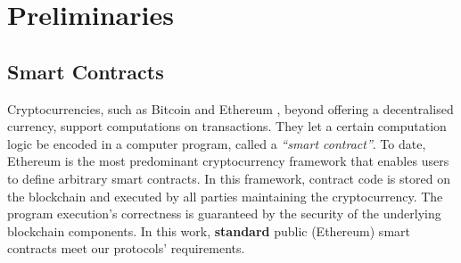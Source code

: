 
\vspace{-3mm}

\section{Preliminaries}


\vspace{-2mm}



\vspace{-2mm}



%


\vspace{-4mm}

\subsection{Smart Contracts}
\vspace{-.5mm}

Cryptocurrencies, such as Bitcoin \cite{bitcoin} and Ethereum \cite{ethereum}, beyond offering a decentralised currency,  support computations on transactions. They let a certain computation logic be encoded in a computer program, called a \emph{``smart contract''}. To date, Ethereum is the most predominant cryptocurrency framework that enables users to define arbitrary smart contracts. In this framework,  contract code is stored on the blockchain and executed by all parties maintaining the cryptocurrency. The program execution's correctness is guaranteed by the security of the underlying blockchain components. In this work,  \textbf{standard} public (Ethereum) smart contracts meet our protocols' requirements.



